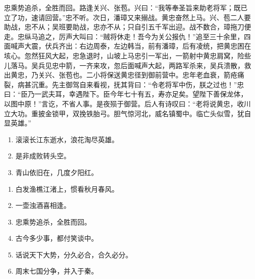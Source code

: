 \documentclass[UTF8,12pt,twoside,a4paper]{ctexart} %
\begin{document}
\begin{titlepage}
忠乘势追杀，全胜而回。路逢关兴、张苞。兴曰：“我等奉圣旨来助老将军；既已立了功，速请回营。”忠不听。次日，潘璋又来搦战。黄忠奋然上马。兴、苞二人要助战，忠不从；吴班要助战，忠亦不从；只自引五千军出迎。战不数合，璋拖刀便走。忠纵马追之，厉声大叫曰：“贼将休走！吾今为关公报仇！”追至三十余里，四面喊声大震，伏兵齐出：右边周泰，左边韩当，前有潘璋，后有凌统，把黄忠困在垓心。忽然狂风大起，忠急退时，山坡上马忠引一军出，一箭射中黄忠肩窝，险些儿落马。吴兵见忠中箭，一齐来攻，忽后面喊声大起，两路军杀来，吴兵溃散，救出黄忠，乃关兴、张苞也。二小将保送黄忠径到御前营中。忠年老血衰，箭疮痛裂，病甚沉重。先主御驾自来看视，抚其背曰：“令老将军中伤，朕之过也！”忠曰：“臣乃一武夫耳，幸遇陛下。臣今年七十有五，寿亦足矣。望陛下善保龙体，以图中原！”言讫，不省人事。是夜殒于御营。后人有诗叹曰：“老将说黄忠，收川立大功。重披金锁甲，双挽铁胎弓。胆气惊河北，威名镇蜀中。临亡头似雪，犹自显英雄。”
		
		

\begin{flushleft}
\end{flushleft}

\begin{enumerate}%
	\songti
  \item 滚滚长江东逝水，浪花淘尽英雄。
  \item 是非成败转头空。
  \item 青山依旧在，几度夕阳红。
\end{enumerate}


\begin{flushleft}
\end{flushleft}

\begin{enumerate}%
	\songti
  \item 白发渔樵江渚上，惯看秋月春风。
  \item 一壶浊酒喜相逢。
  \item 忠乘势追杀，全胜而回。
	\item 古今多少事，都付笑谈中。
  \item 话说天下大势，分久必合，合久必分。
  \item 周末七国分争，并入于秦。
\end{enumerate}


\begin{flushleft}
\end{flushleft}




\end{titlepage}
\end{document}
